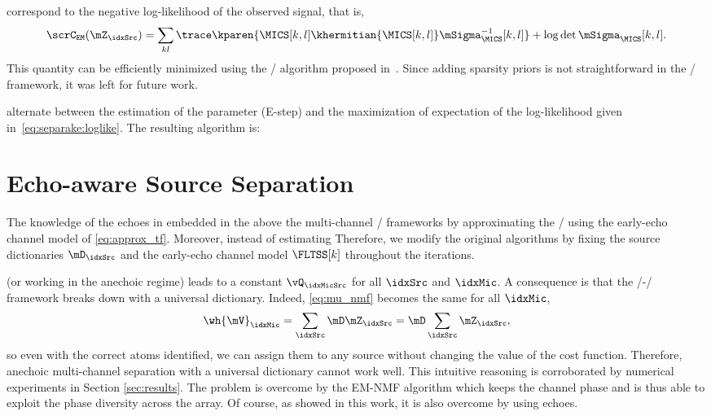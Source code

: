  correspond to the negative log-likelihood of the observed signal, that is,
\begin{equation}\label{eq:separake:loglike}
    \scrC_{\mathtt{EM}}(\mZ_\idxSrc) = \sum\limits_{kl} \trace\kparen{\MICS[k,l] \khermitian{\MICS[k,l]} \mSigma_{\MICS}^{-1}[k,l]} \\
    + \log\det\mSigma_{\MICS}[k,l].
\end{equation}
This quantity can be efficiently minimized using the \EM/ algorithm proposed in~.
Since adding sparsity priors is not straightforward in the \EM/ framework, it was left for future work.


 alternate between the estimation of the parameter (E-step) and the maximization of expectation of the log-likelihood given in~\cref{eq:separake:loglike}.
The resulting algorithm is:

\section{Echo-aware Source Separation}
The knowledge of the echoes in embedded in the above the multi-channel \NMF/ frameworks by approximating the \RTF/ using the early-echo channel model of \eqref{eq:approx_tf}.
Moreover, instead of estimating
Therefore, we modify the original algorithms by fixing the source dictionaries $\mD_\idxSrc$ and the early-echo channel model $\FLTSS[k]$ throughout the iterations.

 (or working in the anechoic regime) leads to a constant $\vQ_{\idxMicSrc}$ for all $\idxSrc$ and $\idxMic$.
A consequence is that the \MU/-\NMF/ framework breaks down with a universal dictionary.
Indeed, \eqref{eq:mu_nmf} becomes the same for all $\idxMic$,
\begin{equation*}
    \wh{\mV}_\idxMic = \sum_{\idxSrc} \mD \mZ_\idxSrc = \mD \sum_\idxSrc \mZ_\idxSrc,
\end{equation*}
so even with the correct atoms identified, we can assign them to any source without changing the value of the cost function.
Therefore, anechoic multi-channel separation with a universal dictionary cannot work well.
This intuitive reasoning is corroborated by numerical experiments in Section \ref{sec:results}.
The problem is overcome by the EM-NMF algorithm which keeps the channel phase and is thus able to exploit the phase diversity across the array.
Of course, as showed in this work, it is also overcome by using echoes.


